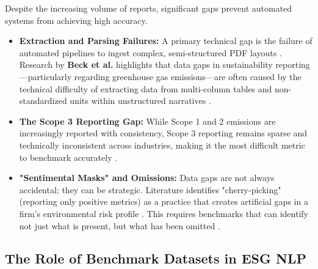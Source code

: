 Despite the increasing volume of reports, significant gaps prevent automated systems from achieving high accuracy.
\begin{itemize}
\item 

\textbf{Extraction and Parsing Failures:} A primary technical gap is the failure of automated pipelines to ingest complex, semi-structured PDF layouts  \parencite[]{marco_bronzini_bf94d949, jacob_beck_9548a833}. Research by \textbf{Beck et al.} highlights that data gaps in sustainability reporting—particularly regarding greenhouse gas emissions—are often caused by the technical difficulty of extracting data from multi-column tables and non-standardized units within unstructured narratives  \parencite{jacob_beck_9548a833}.\item 

\textbf{The Scope 3 Reporting Gap:} While Scope 1 and 2 emissions are increasingly reported with consistency, Scope 3 reporting remains sparse and technically inconsistent across industries, making it the most difficult metric to benchmark accurately  \parencite{jacob_beck_9548a833}.\item 

\textbf{"Sentimental Masks" and Omissions:} Data gaps are not always accidental; they can be strategic. Literature identifies "cherry-picking" (reporting only positive metrics) as a practice that creates artificial gaps in a firm’s environmental risk profile  \parencite[]{xiaojia_wang_02351a60, julia_bingler_268445e3}. This requires benchmarks that can identify not just what is present, but what has been omitted  \parencite{julia_bingler_268445e3}.
\end{itemize}
\subsection{The Role of Benchmark Datasets in ESG NLP}

